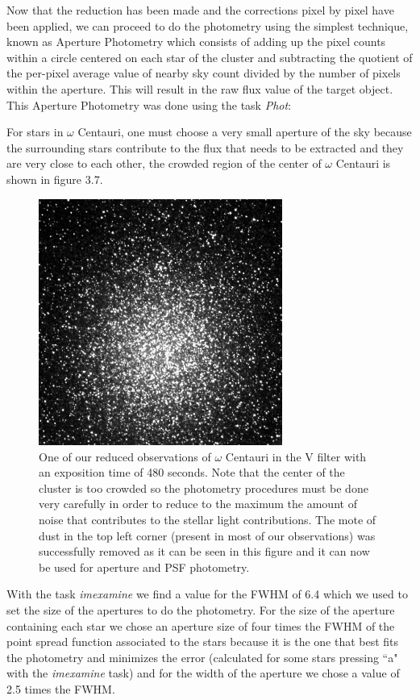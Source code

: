 Now that the reduction has been made and the corrections pixel by pixel have been applied, we can proceed to do the photometry using the simplest technique, known as Aperture Photometry which consists of adding up the pixel counts within a circle centered on each star of the cluster and subtracting the quotient of the per-pixel average value of nearby sky count divided by the number of pixels within the aperture. This will result in the raw flux value of the target object. This Aperture Photometry was done using the task \textit{Phot}:

For stars in $\omega$ Centauri, one must choose a very small aperture of the sky because the surrounding stars contribute to the flux that needs to be extracted and they are very close to each other, the crowded region of the center of $\omega$ Centauri is shown in figure 3.7. 

\begin{figure}[H]
\centering
\includegraphics[width=8cm]{images/NGC5139_red.png}
\caption[NGC5139 as observed in the V filter]{One of our reduced observations of $\omega$ Centauri in the V filter with an exposition time of 480 seconds. Note that the center of the cluster is too crowded so the photometry procedures must be done very carefully in order to reduce to the maximum the amount of noise that contributes to the stellar light contributions. The mote of dust in the top left corner (present in most of our observations) was successfully removed as it can be seen in this figure and it can now be used for aperture and PSF photometry.}
\end{figure}

With the task \textit{imexamine} we find a value for the FWHM of 6.4 which we used to set the size of the apertures to do the photometry. For the size of the aperture containing each star we chose an aperture size of four times the FWHM of the point spread function associated to the stars because it is the one that best fits the photometry and minimizes the error (calculated for some stars pressing ``a" with the \textit{imexamine} task) and for the width of the aperture we chose a value of 2.5 times the FWHM.

